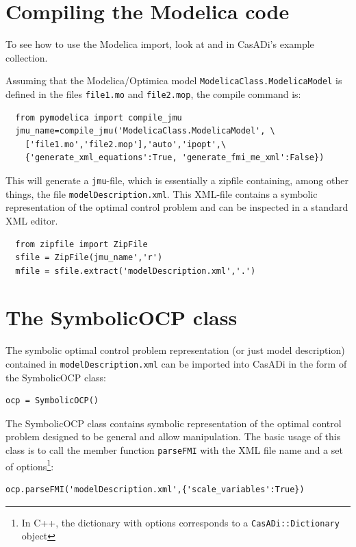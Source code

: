 \documentclass[a4paper,12pt]{book}
\begin{document}
{\section{Compiling the Modelica code} \label{sec:modelica_compilation}
To see how to use the Modelica import, look at  and  in CasADi's example collection. 

Assuming that the Modelica/Optimica model \texttt{ModelicaClass.ModelicaModel} is defined in the files \texttt{file1.mo} and \texttt{file2.mop}, the compile command is:
\begin{verbatim}
  from pymodelica import compile_jmu
  jmu_name=compile_jmu('ModelicaClass.ModelicaModel', \
    ['file1.mo','file2.mop'],'auto','ipopt',\
    {'generate_xml_equations':True, 'generate_fmi_me_xml':False})
\end{verbatim}

This will generate a \texttt{jmu}-file, which is essentially a zipfile containing, among other things, the file \texttt{modelDescription.xml}. This XML-file contains a symbolic representation of the optimal control problem and can be inspected in a standard XML editor.
\begin{verbatim}
  from zipfile import ZipFile
  sfile = ZipFile(jmu_name','r')
  mfile = sfile.extract('modelDescription.xml','.')
\end{verbatim}

\section{The SymbolicOCP class} \label{sec:modelica_import}
The symbolic optimal control problem representation (or just model description) contained in \texttt{modelDescription.xml} can be imported into CasADi in the form of the SymbolicOCP class:
\begin{verbatim}
ocp = SymbolicOCP()
\end{verbatim}

The SymbolicOCP class contains symbolic representation of the optimal control problem designed to be general and allow manipulation. The basic usage of this class is to call the member function \texttt{parseFMI} with the XML file name and a set of options\footnote{In C++, the dictionary with options corresponds to a \texttt{CasADi::Dictionary} object}:
\begin{verbatim}
ocp.parseFMI('modelDescription.xml',{'scale_variables':True})
\end{verbatim}

}
\end{document}
